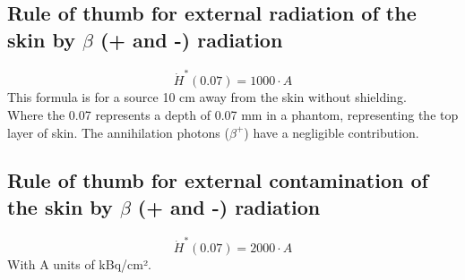\subsection{Rule of thumb for external radiation of the skin by $\beta$ (+ and -) radiation}
\[\dot{H}^*(0.07) = 1000\cdot A\]
This formula is for a source 10 cm away from the skin without shielding. \\
Where the 0.07 represents a depth of 0.07 mm in a phantom, representing the top layer of skin. The annihilation photons ($\beta^+$) have a negligible contribution.

\subsection{Rule of thumb for external contamination of the skin by $\beta$ (+ and -) radiation}
\[\dot{H}^*(0.07) = 2000\cdot A\]
With A units of kBq/cm².
